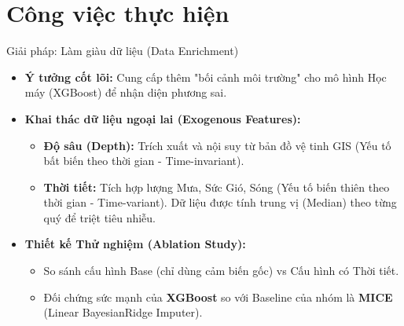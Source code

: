 \section{Công việc thực hiện}

\begin{frame}{Giải pháp: Làm giàu dữ liệu (Data Enrichment)}
  \begin{itemize}
    \item \textbf{Ý tưởng cốt lõi:} Cung cấp thêm "bối cảnh môi trường" cho mô hình Học máy (XGBoost) để nhận diện phương sai.
    \item \textbf{Khai thác dữ liệu ngoại lai (Exogenous Features):}
      \begin{itemize}
        \item \textbf{Độ sâu (Depth):} Trích xuất và nội suy từ bản đồ vệ tinh GIS (Yếu tố bất biến theo thời gian - Time-invariant).
        \item \textbf{Thời tiết:} Tích hợp lượng Mưa, Sức Gió, Sóng (Yếu tố biến thiên theo thời gian - Time-variant). Dữ liệu được tính trung vị (Median) theo từng quý để triệt tiêu nhiễu.
      \end{itemize}
    \item \textbf{Thiết kế Thử nghiệm (Ablation Study):}
      \begin{itemize}
        \item So sánh cấu hình Base (chỉ dùng cảm biến gốc) vs Cấu hình có Thời tiết.
        \item Đối chứng sức mạnh của \textbf{XGBoost} so với Baseline của nhóm là \textbf{MICE} (Linear BayesianRidge Imputer).
      \end{itemize}
  \end{itemize}
\end{frame}
